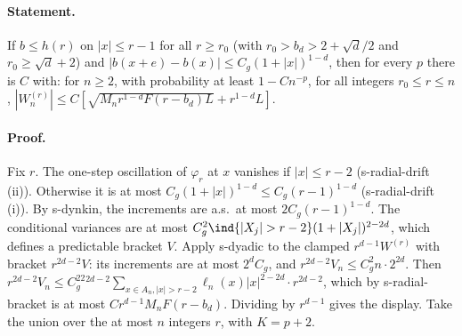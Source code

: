 \paragraph{Statement.} If $b\leq h(r)$ on $|x|\leq r-1$ for all $r\geq r_0$ (with $r_0>b_d>2+\sqrt d/2$ and $r_0\geq\sqrt d+2$) and
$|b(x+e)-b(x)|\leq C_g(1+|x|)^{1-d}$, then for every $p$ there is $C$ with: for $n\geq2$, with probability at least $1-Cn^{-p}$, for all
integers $r_0\leq r\leq n$, $|W^{(r)}_n|\leq C[\sqrt{M_nr^{1-d}F(r-b_d)L}+r^{1-d}L]$.
\paragraph{Proof.} Fix $r$. The one-step oscillation of $\varphi_r$ at $x$ vanishes if $|x|\leq r-2$ (s-radial-drift (ii)). Otherwise it is at most
$C_g(1+|x|)^{1-d}\leq C_g(r-1)^{1-d}$ (s-radial-drift (i)). By s-dynkin, the increments are a.s.\ at most $2C_g(r-1)^{1-d}$. The conditional
variances are at most $C_g^2\ind\{|X_j|>r-2\}(1+|X_j|)^{2-2d}$, which defines a predictable bracket $V$. Apply s-dyadic to the clamped
$r^{d-1}W^{(r)}$ with bracket $r^{2d-2}V$: its increments are at most $2^dC_g$, and $r^{2d-2}V_n\leq C_g^2n\cdot2^{2d}$. Then
$r^{2d-2}V_n\leq C_g^22^{2d-2}\sum_{x\in A_n,|x|>r-2}\ell_n(x)|x|^{2-2d}\cdot r^{2d-2}$, which by s-radial-bracket is at most
$Cr^{d-1}M_nF(r-b_d)$. Dividing by $r^{d-1}$ gives the display. Take the union over the at most $n$ integers $r$, with $K=p+2$.
